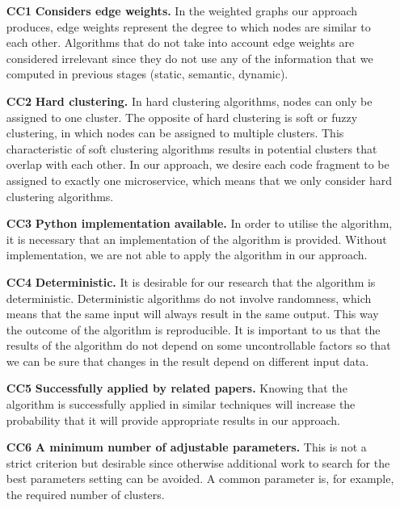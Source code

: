 \begin{itemize}
    \item[\textbf{CC1}] \textbf{Considers edge weights.} In the weighted graphs our approach produces, edge weights represent the degree to which nodes are similar to each other. Algorithms that do not take into account edge weights are considered irrelevant since they do not use any of the information that we computed in previous stages (static, semantic, dynamic).
    \item[\textbf{CC2}] \textbf{Hard clustering.} In hard clustering algorithms, nodes can only be assigned to one cluster. The opposite of hard clustering is soft or fuzzy clustering, in which nodes can be assigned to multiple clusters. This characteristic of soft clustering algorithms results in potential clusters that overlap with each other. In our approach, we desire each code fragment to be assigned to exactly one microservice, which means that we only consider hard clustering algorithms.
    \item[\textbf{CC3}] \textbf{Python implementation available.} In order to utilise the algorithm, it is necessary that an implementation of the algorithm is provided. Without implementation, we are not able to apply the algorithm in our approach.
    \item[\textbf{CC4}] \textbf{Deterministic.} It is desirable for our research that the algorithm is deterministic. Deterministic algorithms do not involve randomness, which means that the same input will always result in the same output. This way the outcome of the algorithm is reproducible. It is important to us that the results of the algorithm do not depend on some uncontrollable factors so that we can be sure that changes in the result depend on different input data. 
    \item[\textbf{CC5}] \textbf{Successfully applied by related papers.} Knowing that the algorithm is successfully applied in similar techniques will increase the probability that it will provide appropriate results in our approach.
    \item[\textbf{CC6}] \textbf{A minimum number of adjustable parameters.} This is not a strict criterion but desirable since otherwise additional work to search for the best parameters setting can be avoided. A common parameter is, for example, the required number of clusters. 
\end{itemize}

